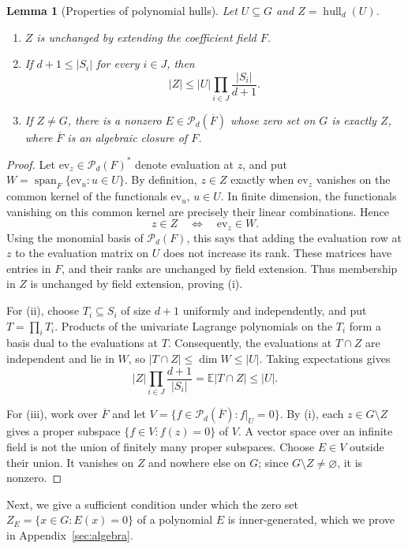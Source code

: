 \documentclass[11pt,letterpaper]{article}
\renewcommand{\le}{\leqslant}
\newtheorem{lemma}[theorem]{Lemma}
\theoremstyle{definition}
\theoremstyle{remark}
\begin{document}
\begin{lemma}[Properties of polynomial hulls]
\label{lem:polynomial-hull}
Let $U\subseteq G$ and $Z=\operatorname{hull}_d(U)$.
\begin{enumerate}[label=(\roman*),leftmargin=*]
\item $Z$ is unchanged by extending the coefficient field $F$.
\item If $d+1\le |S_i|$ for every $i\in J$, then
\[
 |Z|\le |U|\prod_{i\in J}\frac{|S_i|}{d+1}.
\]
\item If $Z\ne G$, there is a nonzero
$E\in\mathcal P_d(\overline F)$ whose zero set on $G$ is exactly $Z$,
where $\overline F$ is an algebraic closure of $F$.
\end{enumerate}
\end{lemma}
\begin{proof}
Let $\mathrm{ev}_z\in\mathcal P_d(F)^*$ denote evaluation at $z$,
and put $W=\operatorname{span}_F\{\mathrm{ev}_u:u\in U\}$.
By definition, $z\in Z$ exactly when $\mathrm{ev}_z$ vanishes
on the common kernel of the functionals $\mathrm{ev}_u$, $u\in U$.
In finite dimension, the functionals vanishing on this common
kernel are precisely their linear combinations. Hence
\[
 z\in Z\quad\Longleftrightarrow\quad\mathrm{ev}_z\in W.
\]
Using the monomial basis of $\mathcal P_d(F)$, this says that
adding the evaluation row at $z$ to the evaluation matrix on $U$
does not increase its rank. These matrices have entries in $F$,
and their ranks are unchanged by field extension. Thus membership
in $Z$ is unchanged by field extension, proving (i).


For (ii), choose $T_i\subseteq S_i$ of size $d+1$ uniformly and
independently, and put $T=\prod_iT_i$.
Products of the univariate Lagrange polynomials on the $T_i$
form a basis dual to the evaluations at $T$.
Consequently, the evaluations at $T\cap Z$ are independent and
lie in $W$, so $|T\cap Z|\le\dim W\le|U|$.
Taking expectations gives
\[
|Z|\prod_{i\in J}\frac{d+1}{|S_i|}
 =\mathbb E|T\cap Z|\le |U|.
\]

For (iii), work over $\overline F$ and let
$V=\{f\in\mathcal P_d(\overline F):f|_U=0\}$.
By (i), each $z\in G\setminus Z$ gives a proper subspace
$\{f\in V:f(z)=0\}$ of $V$.
A vector space over an infinite field is not the union of
finitely many proper subspaces. Choose $E\in V$ outside their
union. It vanishes on $Z$ and nowhere else on $G$; since
$G\setminus Z\ne\varnothing$, it is nonzero.
\end{proof}

Next, we give a sufficient condition under which the zero set $Z_E = \{ x \in G : E(x) = 0 \}$ of a polynomial $E$ is inner-generated, which we prove in Appendix~\ref{sec:algebra}.
\end{document}

